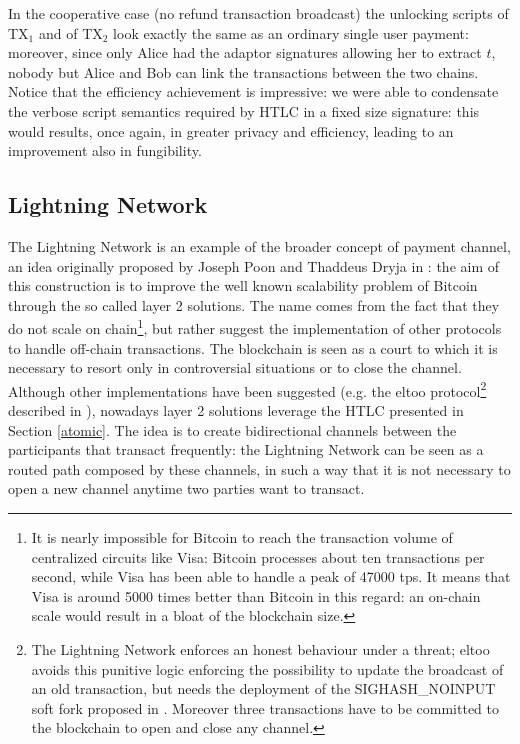 In the cooperative case (no refund transaction broadcast) the unlocking scripts of TX$_1$ and of TX$_2$ look exactly the same as an ordinary single user payment: moreover, since only Alice had the adaptor signatures allowing her to extract $t$, nobody but Alice and Bob can link the transactions between the two chains.
\\
Notice that the efficiency achievement is impressive: we were able to condensate the verbose script semantics required by HTLC in a fixed size signature: this would results, once again, in greater privacy and efficiency, leading to an improvement also in fungibility.

\bigskip

\subsection{Lightning Network}
\label{ln}
The Lightning Network is an example of the broader concept of payment channel, an idea originally proposed by Joseph Poon and Thaddeus Dryja in \cite{RefWork:18}: the aim of this construction is to improve the well known scalability problem of Bitcoin through the so called layer 2 solutions. The name comes from the fact that they do not scale on chain\footnote{It is nearly impossible for Bitcoin to reach the transaction volume of centralized circuits like Visa: Bitcoin processes about ten transactions per second, while Visa has been able to handle a peak of 47000 tps. It means that Visa is around 5000 times better than Bitcoin in this regard: an on-chain scale would result in a bloat of the blockchain size.}, but rather suggest the implementation of other protocols to handle off-chain transactions. The blockchain is seen as a court to which it is necessary to resort only in controversial situations or to close the channel. Although other implementations have been suggested (e.g. the eltoo protocol\footnote{The Lightning Network enforces an honest behaviour under a threat; eltoo avoids this punitive logic enforcing the possibility to update the broadcast of an old transaction, but needs the deployment of the SIGHASH\_NOINPUT soft fork proposed in \cite{BIP5}. Moreover three transactions have to be committed to the blockchain to open and close any channel.} described in \cite{RefWork:19}), nowadays layer 2 solutions leverage the HTLC presented in Section \ref{atomic}. The idea is to create bidirectional channels between the participants that transact frequently: the Lightning Network can be seen as a routed path composed by these channels, in such a way that it is not necessary to open a new channel anytime two parties want to transact.

